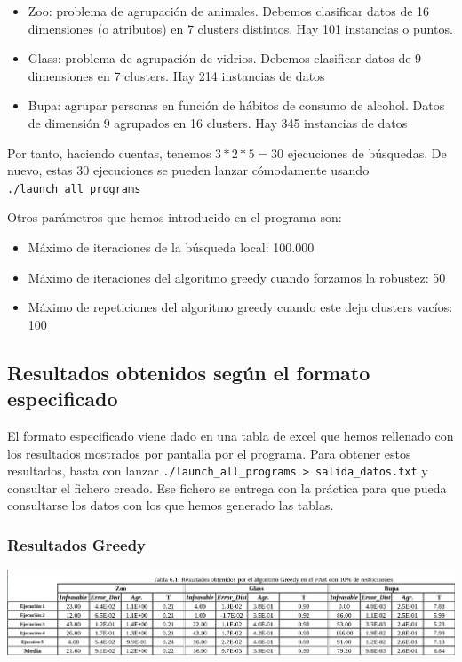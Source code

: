 \documentclass[11pt]{article}
\begin{document}
\begin{itemize}
    \item Zoo: problema de agrupación de animales. Debemos clasificar datos de 16 dimensiones (o atributos) en 7 clusters distintos. Hay 101 instancias o puntos.
    \item Glass: problema de agrupación de vidrios. Debemos clasificar datos de 9 dimensiones en 7 clusters. Hay 214 instancias de datos
    \item Bupa: agrupar personas en función de hábitos de consumo de alcohol. Datos de dimensión 9 agrupados en 16 clusters. Hay 345 instancias de datos
\end{itemize}

Por tanto, haciendo cuentas, tenemos $3 * 2 * 5 = 30$ ejecuciones de búsquedas. De nuevo, estas 30 ejecuciones se pueden lanzar cómodamente usando \lstinline{./launch_all_programs}

Otros parámetros que hemos introducido en el programa son:

\begin{itemize}
    \item Máximo de iteraciones de la búsqueda local: 100.000
    \item Máximo de iteraciones del algoritmo greedy cuando forzamos la robustez: 50
    \item Máximo de repeticiones del algoritmo greedy cuando este deja clusters vacíos: 100
\end{itemize}

\pagebreak

\subsection{Resultados obtenidos según el formato especificado}

El formato especificado viene dado en una tabla de excel que hemos rellenado con los resultados mostrados por pantalla por el programa. Para obtener estos resultados, basta con lanzar \lstinline{./launch_all_programs > salida_datos.txt} y consultar el fichero creado. Ese fichero se entrega con la práctica para que pueda consultarse los datos con los que hemos generado las tablas.

\subsubsection{Resultados Greedy}

\includegraphics[width=\textwidth]{greedy_10}
\end{document}
